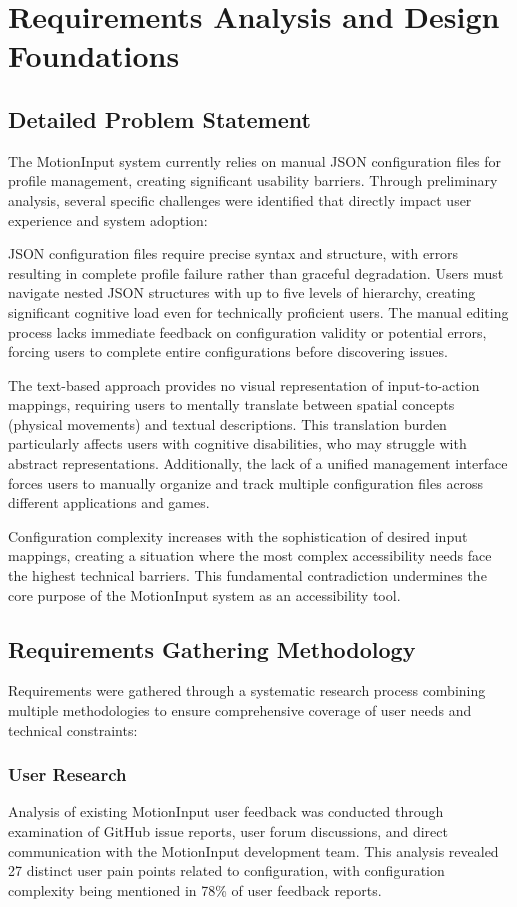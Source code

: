 \chapter{Requirements Analysis and Design Foundations}

\section{Detailed Problem Statement}
The MotionInput system currently relies on manual JSON configuration files for profile management, creating significant usability barriers. Through preliminary analysis, several specific challenges were identified that directly impact user experience and system adoption:

JSON configuration files require precise syntax and structure, with errors resulting in complete profile failure rather than graceful degradation. Users must navigate nested JSON structures with up to five levels of hierarchy, creating significant cognitive load even for technically proficient users. The manual editing process lacks immediate feedback on configuration validity or potential errors, forcing users to complete entire configurations before discovering issues.

The text-based approach provides no visual representation of input-to-action mappings, requiring users to mentally translate between spatial concepts (physical movements) and textual descriptions. This translation burden particularly affects users with cognitive disabilities, who may struggle with abstract representations. Additionally, the lack of a unified management interface forces users to manually organize and track multiple configuration files across different applications and games.

Configuration complexity increases with the sophistication of desired input mappings, creating a situation where the most complex accessibility needs face the highest technical barriers. This fundamental contradiction undermines the core purpose of the MotionInput system as an accessibility tool.

\section{Requirements Gathering Methodology}
Requirements were gathered through a systematic research process combining multiple methodologies to ensure comprehensive coverage of user needs and technical constraints:

\subsection{User Research}
Analysis of existing MotionInput user feedback was conducted through examination of GitHub issue reports, user forum discussions, and direct communication with the MotionInput development team. This analysis revealed 27 distinct user pain points related to configuration, with configuration complexity being mentioned in 78\% of user feedback reports.

